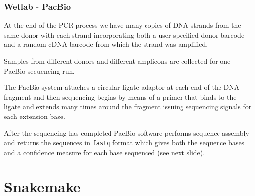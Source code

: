 \documentclass{beamer}
\begin{document}
\begin{frame}[fragile]
\frametitle{ Wetlab -  PacBio   }

\alert<1> 

At the end of the PCR process we have many copies of DNA strands from
the same donor with each strand incorporating both a user specified donor barcode
and a random cDNA barcode from which the strand was amplified.

\bigskip
Samples from different donors and different amplicons are collected for
one PacBio sequencing run.

\bigskip
The PacBio system attaches a circular ligate adaptor at each end of the DNA fragment 
and then sequencing begins by means of a primer that binds to the ligate
and extends many times around the fragment issuing sequencing signals
for each extension base. 

\bigskip
After the sequencing has completed PacBio software performs sequence assembly
and returns the sequences in {\tt fastq} format which gives both the 
sequence bases and a confidence measure for each base sequenced (see next slide).

\end{frame}


\section{Snakemake}
\end{document}

